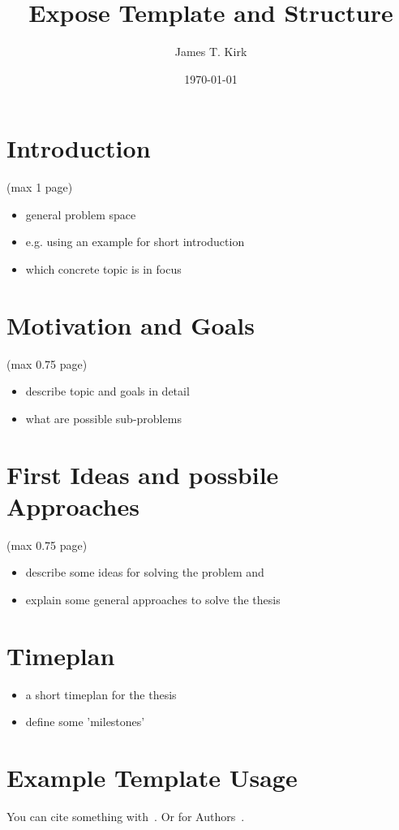 \documentclass{expose} %
\title{Expose Template and Structure}
\author{James T. Kirk}
\date{\today}
\begin{document}
\maketitle

%
\section{Introduction}
 (max 1 page)
\begin{itemize}
    \item general problem space
    \item e.g. using an example for short introduction
    \item which concrete topic is in focus
\end{itemize}

\section{Motivation and Goals}
 (max 0.75 page)
\begin{itemize}
    \item describe topic and goals in detail
    \item what are possible sub-problems
\end{itemize}

\section{First Ideas and possbile Approaches}
 (max 0.75 page)

\begin{itemize}
    \item describe some ideas for solving the problem and
    \item explain some general approaches to solve the thesis
\end{itemize}

\section{Timeplan}
\begin{itemize}
    \item a short timeplan for the thesis
    \item define some 'milestones'
\end{itemize}

\section{Example Template Usage}
You can cite something with~\cite{Berlin}.
Or \citeauthor{raake2014quality} for Authors~\cite{raake2014quality}.
\end{document}
